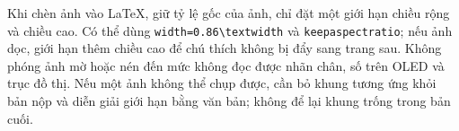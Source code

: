 Khi chèn ảnh vào LaTeX, giữ tỷ lệ gốc của ảnh, chỉ đặt một giới hạn chiều rộng và chiều cao. Có thể dùng \texttt{width=0.86\textbackslash textwidth} và \texttt{keepaspectratio}; nếu ảnh dọc, giới hạn thêm chiều cao để chú thích không bị đẩy sang trang sau. Không phóng ảnh mờ hoặc nén đến mức không đọc được nhãn chân, số trên OLED và trục đồ thị. Nếu một ảnh không thể chụp được, cần bỏ khung tương ứng khỏi bản nộp và diễn giải giới hạn bằng văn bản; không để lại khung trống trong bản cuối.
